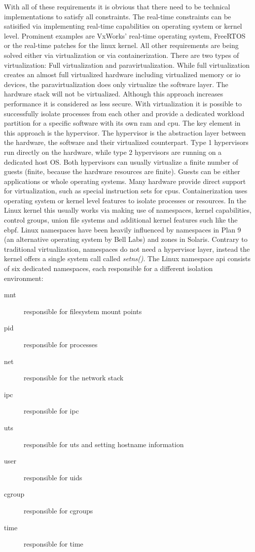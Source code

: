 \documentclass[titlepage]{report}
\begin{document}
With all of these requirements it is obvious that there need to be technical implementations to satisfy all constraints.
The real-time constraints can be satisified via implementing real-time capabilities on operating system or kernel level.
Prominent examples are VxWorks' real-time operating system\cite{vxworks}, FreeRTOS\cite{freertos} or the real-time patches for the linux kernel\cite{realtimelinux}.
All other requirements are being solved either via virtualization or via containerization. There are two types of virtualization: Full virtualization and paravirtualization.
While full virtualization creates an almost full virtualized hardware including virtualized memory or \gls{io} devices, the paravirtualization does only virtualize
the software layer. The hardware stack will not be virtualized. Although this approach increases performance it is considered as less secure. With virtualization
it is possible to successfully isolate processes from each other and provide a dedicated workload partition for a specific software with its own \gls{ram} and \gls{cpu}.
The key element in this approach is the hypervisor. The hypervisor is the abstraction layer between the hardware, the software and their virtualized counterpart. 
Type 1 hypervisors run directly on the hardware, while type 2 hypervisors are running
on a dedicated host OS. Both hypervisors can usually virtualize a finite number of guests (finite, because the hardware resources are finite). Guests can be either applications or whole operating systems.
Many hardware provide direct support for virtualization, such as special instruction sets for \glspl{cpu}.
Containerization uses operating system or kernel level features to isolate processes or resources. In the Linux kernel this usually works via
making use of namespaces, kernel capabilities, control groups, union file systems and additional kernel features such like the \gls{ebpf}. Linux namespaces have been heavily influenced by namespaces in Plan 9 (an alternative
operating system by Bell Labs) and zones in Solaris. Contrary to traditional virtualization, namespaces do not need a hypervisor layer, instead the kernel offers
a single system call called \emph{setns()}\cite{mannamespaces}. The Linux namespace \gls{api} consists of six dedicated namespaces, each responsible for a different isolation environment\cite{namespacelist}:
\begin{description}
    \item[mnt] responsible for filesystem mount points
    \item[pid] responsible for processes
    \item[net] responsible for the network stack
    \item[ipc] responsible for \gls{ipc}
    \item[uts] responsible for \gls{uts} and setting hostname information
    \item[user] responsible for \glspl{uid}
    \item[cgroup] responsible for \glspl{cgroup}
    \item[time] responsible for time  
\end{description}
\end{document}
